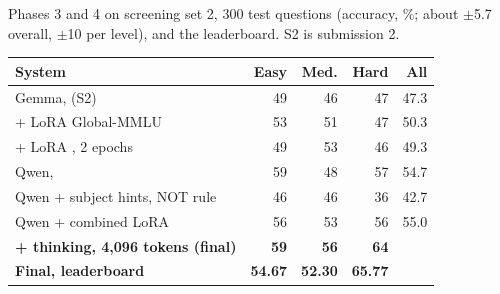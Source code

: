 \begin{center}\captionsetup{type=table}
\footnotesize
\caption{Phases 3 and 4 on screening set 2, 300 test questions (accuracy, \%; about $\pm$5.7 overall, $\pm$10 per level), and the leaderboard. S2 is submission 2.}\label{tab:phase2}
\begin{tabularx}{\columnwidth}{@{}Yrrrr@{}}
\toprule
System & Easy & Med. & Hard & All \\
\midrule
Gemma,  (S2) & 49 & 46 & 47 & 47.3 \\
+ LoRA Global-MMLU & 53 & 51 & 47 & 50.3 \\
+ LoRA \sinmulu{}, 2 epochs & 49 & 53 & 46 & 49.3 \\
Qwen,  & 59 & 48 & 57 & 54.7 \\
Qwen + subject hints, NOT rule & 46 & 46 & 36 & 42.7 \\
Qwen + combined LoRA & 56 & 53 & 56 & 55.0 \\
\textbf{+ thinking, 4,096 tokens (final)} & \textbf{59} & \textbf{56} & \textbf{64} &  \\
\midrule
\textbf{Final, leaderboard} & \textbf{54.67} & \textbf{52.30} & \textbf{65.77} &  \\
\bottomrule
\end{tabularx}
\end{center}

